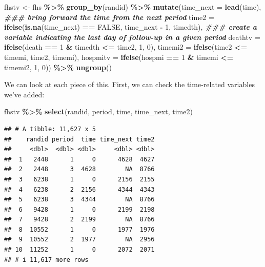 \documentclass[
]{book}
\newenvironment{Shaded}{\begin{snugshade}}{\end{snugshade}}
\newcommand{\AttributeTok}[1]{\textcolor[rgb]{0.13,0.29,0.53}{#1}}
\newcommand{\ConstantTok}[1]{\textcolor[rgb]{0.56,0.35,0.01}{#1}}
\newcommand{\DecValTok}[1]{\textcolor[rgb]{0.00,0.00,0.81}{#1}}
\newcommand{\DocumentationTok}[1]{\textcolor[rgb]{0.56,0.35,0.01}{\textbf{\textit{#1}}}}
\newcommand{\FunctionTok}[1]{\textcolor[rgb]{0.13,0.29,0.53}{\textbf{#1}}}
\newcommand{\NormalTok}[1]{#1}
\newcommand{\OtherTok}[1]{\textcolor[rgb]{0.56,0.35,0.01}{#1}}
\newcommand{\SpecialCharTok}[1]{\textcolor[rgb]{0.81,0.36,0.00}{\textbf{#1}}}
\begin{document}
\begin{Shaded}
\begin{Highlighting}[]
\NormalTok{fhstv }\OtherTok{\textless{}{-}}\NormalTok{ fhs }\SpecialCharTok{\%\textgreater{}\%}
  \FunctionTok{group\_by}\NormalTok{(randid) }\SpecialCharTok{\%\textgreater{}\%}
  \FunctionTok{mutate}\NormalTok{(}\AttributeTok{time\_next =} \FunctionTok{lead}\NormalTok{(time), }\DocumentationTok{\#\#\# bring forward the time from the next period}
         \AttributeTok{time2 =} \FunctionTok{ifelse}\NormalTok{(}\FunctionTok{is.na}\NormalTok{(time\_next) }\SpecialCharTok{==} \ConstantTok{FALSE}\NormalTok{,}
\NormalTok{                        time\_next }\SpecialCharTok{{-}} \DecValTok{1}\NormalTok{,}
\NormalTok{                        timedth), }\DocumentationTok{\#\#\# create a variable indicating the last day of follow{-}up in a given period}
         \AttributeTok{deathtv =} \FunctionTok{ifelse}\NormalTok{(death }\SpecialCharTok{==} \DecValTok{1} \SpecialCharTok{\&}\NormalTok{ timedth }\SpecialCharTok{\textless{}=}\NormalTok{ time2, }\DecValTok{1}\NormalTok{, }\DecValTok{0}\NormalTok{),}
         \AttributeTok{timemi2 =} \FunctionTok{ifelse}\NormalTok{(time2 }\SpecialCharTok{\textless{}=}\NormalTok{ timemi, time2, timemi),}
         \AttributeTok{hospmitv =} \FunctionTok{ifelse}\NormalTok{(hospmi }\SpecialCharTok{==} \DecValTok{1} \SpecialCharTok{\&}\NormalTok{ timemi }\SpecialCharTok{\textless{}=}\NormalTok{ timemi2, }\DecValTok{1}\NormalTok{, }\DecValTok{0}\NormalTok{)) }\SpecialCharTok{\%\textgreater{}\%} 
  \FunctionTok{ungroup}\NormalTok{()}
\end{Highlighting}
\end{Shaded}

We can look at each piece of this. First, we can check the time-related variables we've added:

\begin{Shaded}
\begin{Highlighting}[]
\NormalTok{fhstv }\SpecialCharTok{\%\textgreater{}\%} 
  \FunctionTok{select}\NormalTok{(randid, period, time, time\_next, time2)}
\end{Highlighting}
\end{Shaded}

\begin{verbatim}
## # A tibble: 11,627 x 5
##    randid period  time time_next time2
##     <dbl>  <dbl> <dbl>     <dbl> <dbl>
##  1   2448      1     0      4628  4627
##  2   2448      3  4628        NA  8766
##  3   6238      1     0      2156  2155
##  4   6238      2  2156      4344  4343
##  5   6238      3  4344        NA  8766
##  6   9428      1     0      2199  2198
##  7   9428      2  2199        NA  8766
##  8  10552      1     0      1977  1976
##  9  10552      2  1977        NA  2956
## 10  11252      1     0      2072  2071
## # i 11,617 more rows
\end{verbatim}
\end{document}
